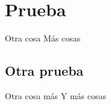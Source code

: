 \documentclass[14pt]{beamer}
\begin{document}
\section{Prueba}

\begin{frame}{Otra cosa}
    Más cosas
\end{frame}

\subsection{Otra prueba}

\begin{frame}{Otra cosa más}
    Y más cosas
\end{frame}
    
\end{document}
